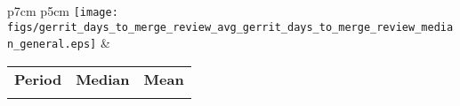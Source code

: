 


\begin{tabular}{p{7cm} p{5cm}}
    \vspace{0pt} 
    \texttt{[image: figs/gerrit\_days\_to\_merge\_review\_avg\_gerrit\_days\_to\_merge\_review\_median\_general.eps]}
    & 
    \vspace{0pt}
    \begin{tabular}{l|r|r|}%
    \bfseries Period & \bfseries Median & \bfseries Mean %
    \csvreader[head to column names]{data/gerrit_days_to_merge_review_avg_gerrit_days_to_merge_review_median_general.csv}{}%
    {\\ & \daystomergereviewmedian & \daystomergereviewavg}
    \end{tabular}
\end{tabular}
